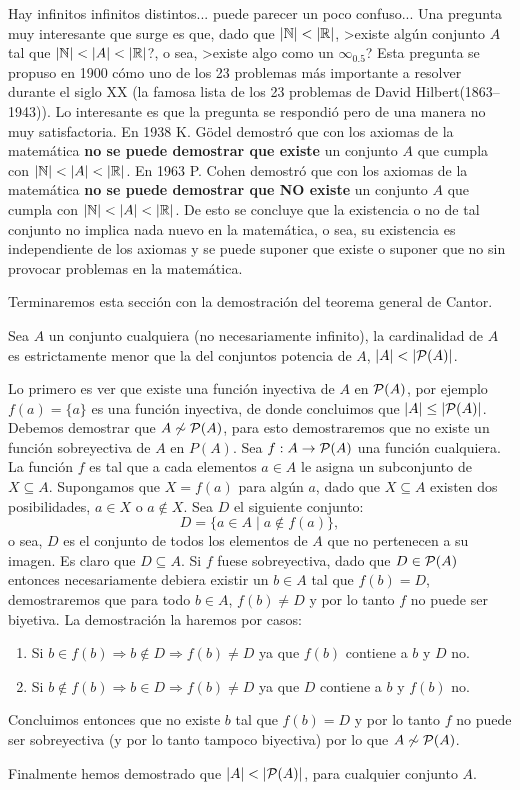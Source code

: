 Hay infinitos infinitos distintos... puede parecer un poco confuso...
Una pregunta muy interesante que surge es que, dado que $|\N|<|\R|$, >existe algún conjunto $A$ tal que $|\N|<|A|<|\R|$?, o sea, >existe algo como un $\infty_{0\text{.}5}$?
Esta pregunta se propuso en 1900 cómo uno de los 23 problemas más importante a resolver durante el siglo XX (la famosa lista de los 23 problemas de David Hilbert(1863--1943)).
Lo interesante es que la pregunta se respondió pero de una manera no muy satisfactoria.
En 1938 K. G\"odel demostró que con los axiomas de la matemática {\bf no se puede demostrar que existe} un conjunto $A$ que cumpla con $|\N|<|A|<|\R|$.
En 1963 P. Cohen demostró que con los axiomas de la matemática {\bf no se puede demostrar que NO existe} un conjunto $A$ que cumpla con $|\N|<|A|<|\R|$.
De esto se concluye que la existencia o no de tal conjunto no implica nada nuevo en la matemática, o sea, su existencia es independiente de los axiomas y se puede suponer que existe o suponer que no sin provocar problemas en la matemática.

Terminaremos esta sección con la demostración del teorema general de Cantor.

\begin{teorema}[(Cantor)]\label{teo:cantor}
Sea $A$ un conjunto cualquiera (no necesariamente infinito), la cardinalidad de $A$ es estrictamente menor que la del conjuntos potencia de $A$, $|A|<|\P(A)|$.

\begin{demostracion}
Lo primero es ver que existe una función inyectiva de $A$ en $\P(A)$, por ejemplo $f(a)=\{a\}$ es una función inyectiva, de donde concluimos que $|A|\leq|\P(A)|$.
Debemos demostrar que $A\not\eqr\P(A)$, para esto demostraremos que no existe un función sobreyectiva de $A$ en $P(A)$.
Sea $f:A\rightarrow\P(A)$ una función cualquiera.
La función $f$ es tal que a cada elementos $a\in A$ le asigna un subconjunto de $X\subseteq A$.
Supongamos que $X=f(a)$ para algún $a$, dado que $X\subseteq A$ existen dos posibilidades, $a\in X$ o $a\not\in X$.
Sea $D$ el siguiente conjunto:
\[
D=\{a\in A\;|\; a\notin f(a)\},
\]
o sea, $D$ es el conjunto de todos los elementos de $A$ que no pertenecen a su imagen.
Es claro que $D\subseteq A$.
Si $f$ fuese sobreyectiva, dado que $D\in\P(A)$ entonces necesariamente debiera existir un $b\in A$ tal que $f(b)=D$, demostraremos que para todo $b\in A$, $f(b)\not=D$ y por lo tanto $f$ no puede ser biyetiva.
La demostración la haremos por casos:
\begin{enumerate}
  \item Si $b\in f(b)\Rightarrow b\notin D\Rightarrow f(b)\not=D$ ya que $f(b)$ contiene a $b$ y $D$ no.
  \item Si $b\notin f(b)\Rightarrow b\in D\Rightarrow f(b)\not=D$ ya que $D$ contiene a $b$ y $f(b)$ no.
\end{enumerate}
Concluimos entonces que no existe $b$ tal que $f(b)=D$ y por lo tanto $f$ no puede ser sobreyectiva (y por lo tanto tampoco biyectiva) por lo que $A\not\eqr\P(A)$.

Finalmente hemos demostrado que $|A|<|\P(A)|$, para cualquier conjunto $A$.
\end{demostracion}
\end{teorema}

